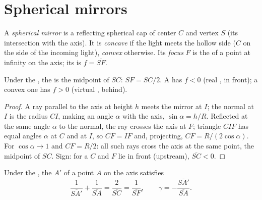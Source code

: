 \section{Spherical mirrors}

\begin{definition}\label{def:b1:mirrors-thin-lenses:mirror}
A \emph{spherical mirror} is a reflecting spherical cap of center $C$
and vertex $S$ (its intersection with the axis). It is \emph{concave}
if the light meets the hollow side ($C$ on the side of the incoming
light), \emph{convex} otherwise. Its \emph{focus} $F$ is the  of a
point at infinity on the axis; its  is $f = \overline{SF}$.
\end{definition}

\begin{proposition}\label{prop:b1:mirrors-thin-lenses:focus}
Under the , the  is the midpoint of $SC$:
$\overline{SF} = \overline{SC}/2$. A  has $f < 0$ (real
, in front); a convex one has $f > 0$ (virtual , behind).
\end{proposition}

\begin{proof}
A ray parallel to the axis at height $h$ meets the mirror at $I$; the
normal at $I$ is the radius $CI$, making an angle $\alpha$ with the
axis, $\sin\alpha = h/R$. Reflected at the same angle $\alpha$ to the
normal, the ray crosses the axis at $F$; triangle $CIF$ has equal
angles $\alpha$ at $C$ and at $I$, so $CF = IF$ and, projecting,
$CF = R/(2\cos\alpha)$. For  $\cos\alpha \to 1$ and
$CF = R/2$: all such rays cross the axis at the same point, the
midpoint of $SC$. Sign: for a  $C$ and $F$ lie in front
(upstream), $\overline{SC} < 0$.
\end{proof}

\begin{theorem}\label{thm:b1:mirrors-thin-lenses:mirrorconj}
Under the , the  $A'$ of a point $A$ on the axis
satisfies
\[
\frac{1}{\overline{SA'}} + \frac{1}{\overline{SA}} = \frac{2}{\overline{SC}}
= \frac{1}{\overline{SF}},
\qquad
\gamma = -\frac{\overline{SA'}}{\overline{SA}} .
\]
\end{theorem}


